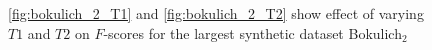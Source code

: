 \documentclass[10pt, conference, compsocconf]{IEEEtran}
\begin{document}
\begin{figure}[t]	
	\begin{minipage}[t]{0.5\linewidth}
	\end{minipage}%
	\hfill%
	\begin{minipage}[t]{0.5\linewidth}
	\end{minipage}
	\caption{ \ref{fig:bokulich_2_T1} and \ref{fig:bokulich_2_T2} show effect of varying $T1$ and $T2$ on $F$-scores for the largest synthetic dataset Bokulich$_2$ }	
\end{figure}
\end{document}
